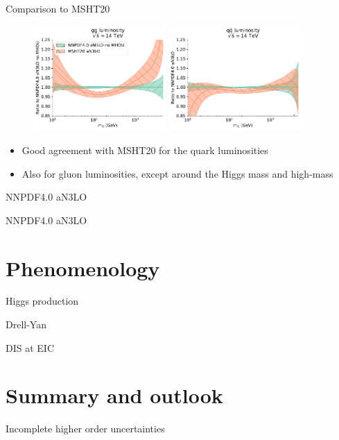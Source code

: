\documentclass[aspectratio=169, 9pt,t]{beamer}
\begin{document}
\begin{frame}{Comparison to MSHT20}
  \begin{figure}[!t]
    \centering
    \includegraphics[width=0.45\textwidth]{figures/gg_plot_lumi1d_msht20.pdf}
    \includegraphics[width=0.45\textwidth]{figures/qqbar_plot_lumi1d_msht20.pdf}
  \end{figure}
  \begin{itemize}
    \item Good agreement with MSHT20 for the quark luminosities
    \item Also for gluon luminosities, except around the Higgs mass and high-mass
  \end{itemize}
\end{frame}


\begin{frame}{NNPDF4.0 aN3LO}
\end{frame}

\begin{frame}{NNPDF4.0 aN3LO}
\end{frame}

\section{Phenomenology}

\begin{frame}{Higgs production}

\end{frame}


\begin{frame}{Drell-Yan}

\end{frame}


\begin{frame}{DIS at EIC}

\end{frame}


\section{Summary and outlook}
\begin{frame}{Incomplete higher order uncertainties}
\end{frame}
\end{document}
